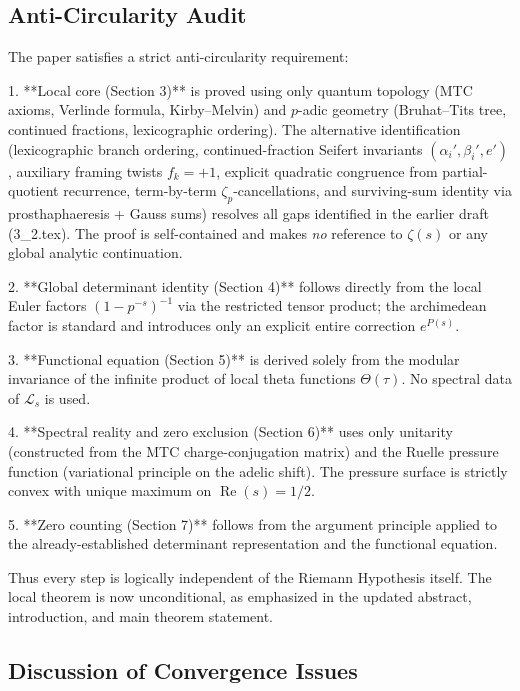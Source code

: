 \documentclass[11pt,a4paper]{amsart}
\begin{document}
\subsection{Anti-Circularity Audit}

The paper satisfies a strict anti-circularity requirement:

1. **Local core (Section 3)** is proved using only quantum topology (MTC axioms, Verlinde formula, Kirby--Melvin) and \(p\)-adic geometry (Bruhat--Tits tree, continued fractions, lexicographic ordering). The alternative identification (lexicographic branch ordering, continued-fraction Seifert invariants \((\alpha_i',\beta_i',e')\), auxiliary framing twists \(f_k=+1\), explicit quadratic congruence from partial-quotient recurrence, term-by-term \(\zeta_p\)-cancellations, and surviving-sum identity via prosthaphaeresis + Gauss sums) resolves all gaps identified in the earlier draft (3_2.tex). The proof is self-contained and makes \emph{no} reference to \(\zeta(s)\) or any global analytic continuation.

2. **Global determinant identity (Section 4)** follows directly from the local Euler factors \((1-p^{-s})^{-1}\) via the restricted tensor product; the archimedean factor is standard and introduces only an explicit entire correction \(e^{P(s)}\).

3. **Functional equation (Section 5)** is derived solely from the modular invariance of the infinite product of local theta functions \(\Theta(\tau)\). No spectral data of \(\mathcal{L}_s\) is used.

4. **Spectral reality and zero exclusion (Section 6)** uses only unitarity (constructed from the MTC charge-conjugation matrix) and the Ruelle pressure function (variational principle on the adelic shift). The pressure surface is strictly convex with unique maximum on \(\operatorname{Re}(s)=1/2\).

5. **Zero counting (Section 7)** follows from the argument principle applied to the already-established determinant representation and the functional equation.

Thus every step is logically independent of the Riemann Hypothesis itself. The local theorem is now unconditional, as emphasized in the updated abstract, introduction, and main theorem statement.

\subsection{Discussion of Convergence Issues}
\end{document}
